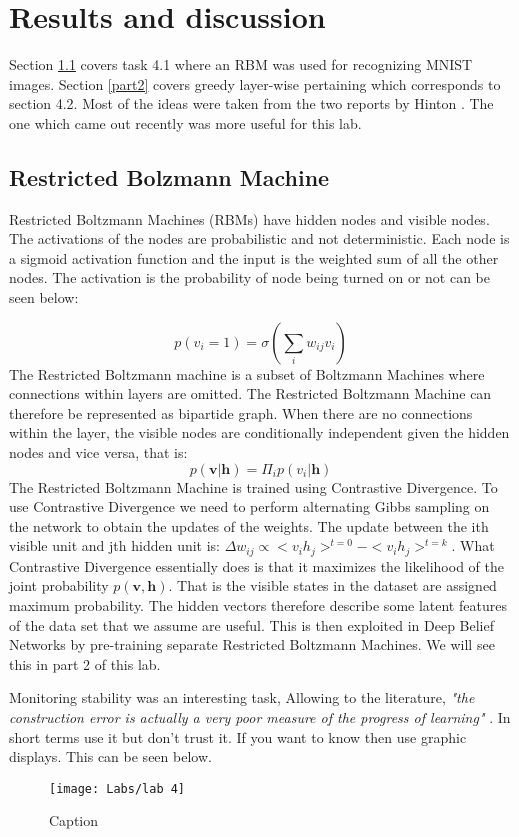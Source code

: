 \documentclass[a4paper]{article}
\begin{document}
\section{Results and discussion}
Section \ref{part1} covers task 4.1 where an RBM was used for recognizing MNIST images. Section \ref{part2} covers greedy layer-wise pertaining which corresponds to section 4.2. Most of the ideas were taken from the two reports by Hinton \cite{hinton2006fast} \cite{hinton2012practical}. The one which came out recently was more useful for this lab. 

\subsection{Restricted Bolzmann Machine}
\label{part1}
Restricted Boltzmann Machines (RBMs) have hidden nodes and visible nodes. The activations of the nodes are probabilistic and not deterministic. Each node is a sigmoid activation function and the input is the weighted sum of all the other nodes. The activation is the probability of node being turned on or not can be seen below:

$$
p(v_i = 1) = \sigma (\sum_i w_{ij}v_{i})
$$
The Restricted Boltzmann machine is a subset of Boltzmann Machines where connections within layers are omitted. The Restricted Boltzmann Machine can therefore be represented as bipartide graph. When there are no connections within the layer, the visible nodes are conditionally independent given the hidden nodes and vice versa, that is:
$$
p(\textbf{v} |  \textbf{h}) = \Pi_{i}p(v_i | \textbf{h})
$$
The Restricted Boltzmann Machine is trained using Contrastive Divergence. To use Contrastive Divergence we need to perform alternating Gibbs sampling on the network to obtain the updates of the weights. The update between the ith visible unit and jth hidden unit is: $\Delta w_{ij} \propto <v_i h_j>^{t=0} - <v_i h_j>^{t=k}$. What Contrastive Divergence essentially does is that it maximizes the likelihood of the joint probability $p(\textbf{v}, \textbf{h})$. That is the visible states in the dataset are assigned maximum probability. The hidden vectors therefore describe some latent features of the data set that we assume are useful. This is then exploited in Deep Belief Networks by pre-training separate Restricted Boltzmann Machines. We will see this in part 2 of this lab.

Monitoring stability was an interesting task, Allowing to the literature, \textit{"the construction error is actually a very poor measure of the progress of learning"} \cite{hinton2012practical}. In short terms use it but don't trust it. If you want to know then use graphic displays. This can be seen below. 
\begin{figure}
    \centering
    \texttt{[image: Labs/lab 4]}
    \caption{Caption}
    \label{fig:enter-label}
\end{figure}
\end{document}
